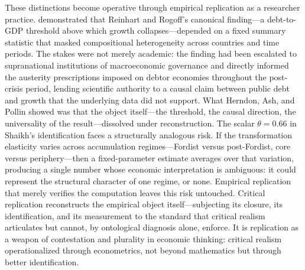 These distinctions become operative through empirical replication as a researcher practice. \citet{HAP2014} demonstrated that Reinhart and Rogoff's canonical finding---a debt-to-GDP threshold above which growth collapses---depended on a fixed summary statistic that masked compositional heterogeneity across countries and time periods. The stakes were not merely academic: the finding had been escalated to supranational institutions of macroeconomic governance and directly informed the austerity prescriptions imposed on debtor economies throughout the post-crisis period, lending scientific authority to a causal claim between public debt and growth that the underlying data did not support. What Herndon, Ash, and Pollin showed was that the object itself---the threshold, the causal direction, the universality of the result---dissolved under reconstruction. The scalar $\theta = 0.66$ in Shaikh's identification faces a structurally analogous risk. If the transformation elasticity varies across accumulation regimes---Fordist versus post-Fordist, core versus periphery---then a fixed-parameter estimate averages over that variation, producing a single number whose economic interpretation is ambiguous: it could represent the structural character of one regime, or none. Empirical replication that merely verifies the computation leaves this risk untouched. Critical replication reconstructs the empirical object itself---subjecting its closure, its identification, and its measurement to the standard that critical realism articulates but cannot, by ontological diagnosis alone, enforce. It is replication as a weapon of contestation and plurality in economic thinking: critical realism operationalized through econometrics, not beyond mathematics but through better identification.

